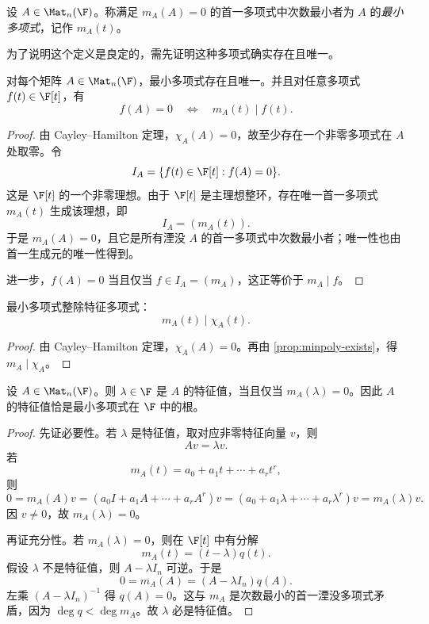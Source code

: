 \begin{definition}
设 \(A\in \Mat_n(\F)\)。称满足 \(m_A(A)=0\) 的首一多项式中次数最小者为 \(A\) 的\emph{最小多项式}，记作 \(m_A(t)\)。
\end{definition}

为了说明这个定义是良定的，需先证明这种多项式确实存在且唯一。

\begin{proposition}\label{prop:minpoly-exists}
对每个矩阵 \(A\in \Mat_n(\F)\)，最小多项式存在且唯一。并且对任意多项式 \(f(t)\in \F[t]\)，有
\[
f(A)=0\quad\Longleftrightarrow\quad m_A(t)\mid f(t).
\]
\end{proposition}

\begin{proof}
由 Cayley--Hamilton 定理，\(\chi_A(A)=0\)，故至少存在一个非零多项式在 \(A\) 处取零。令
\[
I_A=\{f(t)\in \F[t]:f(A)=0\}.
\]
这是 \(\F[t]\) 的一个非零理想。由于 \(\F[t]\) 是主理想整环，存在唯一首一多项式 \(m_A(t)\) 生成该理想，即
\[
I_A=(m_A(t)).
\]
于是 \(m_A(A)=0\)，且它是所有湮没 \(A\) 的首一多项式中次数最小者；唯一性也由首一生成元的唯一性得到。

进一步，\(f(A)=0\) 当且仅当 \(f\in I_A=(m_A)\)，这正等价于 \(m_A\mid f\)。
\end{proof}

\begin{corollary}\label{cor:minpoly-divides-charpoly}
最小多项式整除特征多项式：
\[
m_A(t)\mid \chi_A(t).
\]
\end{corollary}

\begin{proof}
由 Cayley--Hamilton 定理，\(\chi_A(A)=0\)。再由 \cref{prop:minpoly-exists}，得 \(m_A\mid \chi_A\)。
\end{proof}

\begin{proposition}\label{prop:eigenvalues-roots-minpoly}
设 \(A\in \Mat_n(\F)\)。则 \(\lambda\in \F\) 是 \(A\) 的特征值，当且仅当 \(m_A(\lambda)=0\)。因此 \(A\) 的特征值恰是最小多项式在 \(\F\) 中的根。
\end{proposition}

\begin{proof}
先证必要性。若 \(\lambda\) 是特征值，取对应非零特征向量 \(v\)，则
\[
Av=\lambda v.
\]
若
\[
m_A(t)=a_0+a_1t+\cdots+a_rt^r,
\]
则
\[
0=m_A(A)v=(a_0I+a_1A+\cdots+a_rA^r)v=(a_0+a_1\lambda+\cdots+a_r\lambda^r)v=m_A(\lambda)v.
\]
因 \(v\neq 0\)，故 \(m_A(\lambda)=0\)。

再证充分性。若 \(m_A(\lambda)=0\)，则在 \(\F[t]\) 中有分解
\[
m_A(t)=(t-\lambda)q(t).
\]
假设 \(\lambda\) 不是特征值，则 \(A-\lambda I_n\) 可逆。于是
\[
0=m_A(A)=(A-\lambda I_n)q(A).
\]
左乘 \((A-\lambda I_n)^{-1}\) 得 \(q(A)=0\)。这与 \(m_A\) 是次数最小的首一湮没多项式矛盾，因为 \(\deg q<\deg m_A\)。故 \(\lambda\) 必是特征值。
\end{proof}


